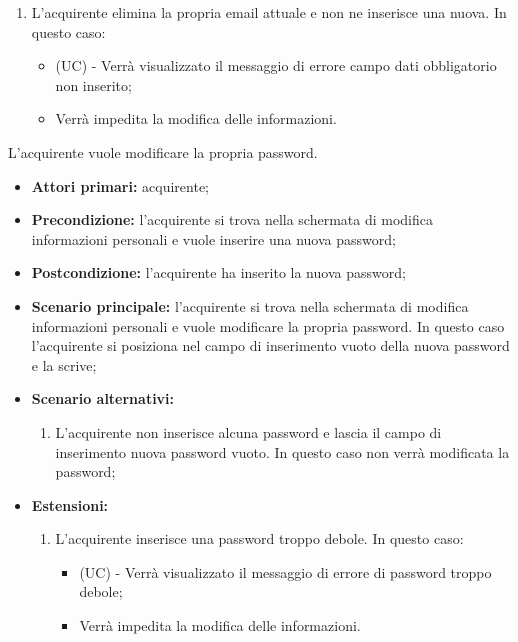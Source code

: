 \begin{itemize}
\begin{enumerate}[label=\lett]
\begin{itemize}
        \end{itemize}
        \item L'acquirente elimina la propria email attuale e non ne inserisce una nuova. In questo caso:
        \begin{itemize}
            \item (UC) - Verrà visualizzato il messaggio di errore campo dati obbligatorio non inserito;
            \item Verrà impedita la modifica delle informazioni.
        \end{itemize}
    \end{enumerate}
\end{itemize}

L'acquirente vuole modificare la propria password.
\begin{itemize}
    \item \textbf{Attori primari:} acquirente;
    \item \textbf{Precondizione:} l'acquirente si trova nella schermata di modifica informazioni personali e vuole inserire una nuova password;
    \item \textbf{Postcondizione:} l'acquirente ha inserito la nuova password;
    \item \textbf{Scenario principale:} l'acquirente si trova nella schermata di modifica informazioni personali e vuole modificare la propria password. In questo caso l'acquirente si posiziona nel campo di inserimento vuoto della nuova password e la scrive;
    \item \textbf{Scenario alternativi:} 
     \begin{enumerate}[label=\lett]
     \item L'acquirente non inserisce alcuna password e lascia il campo di inserimento nuova password vuoto. In questo caso non verrà modificata la password;
     \end{enumerate}
    \item \textbf{Estensioni:}
    \begin{enumerate}[label=\lett]
        \item L'acquirente inserisce una password troppo debole. In questo caso:
        \begin{itemize}
            \item (UC) - Verrà visualizzato il messaggio di errore di password troppo debole;
            \item Verrà impedita la modifica delle informazioni.
        \end{itemize}
    \end{enumerate}
\end{itemize}

